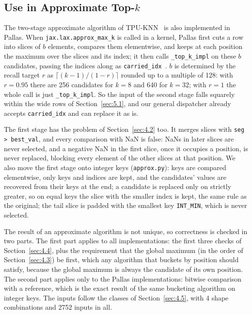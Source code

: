 \documentclass[sigconf,nonacm,balance=false]{acmart}
\newcommand{\code}[1]{\texttt{#1}}
\begin{document}
\subsection{\texorpdfstring{Use in Approximate Top-$k$}{Use in Approximate Top-k}}
\label{sec:8.3}

The two-stage approximate algorithm of TPU-KNN~\cite{chern2022tpuknn} is also implemented in Pallas. When \code{jax.\allowbreak{}lax.\allowbreak{}approx\_\allowbreak{}max\_\allowbreak{}k} is called in a kernel, Pallas first cuts a row into slices of $b$ elements, compares them elementwise, and keeps at each position the maximum over the slices and its index; it then calls \code{\_\allowbreak{}top\_\allowbreak{}k\_\allowbreak{}impl} on these $b$ candidates, passing the indices along as \code{carried\_\allowbreak{}idx}~\cite{jax-topk-impl}. $b$ is determined by the recall target $r$ as $\lceil (k - 1)/(1 - r) \rceil$ rounded up to a multiple of 128: with $r = 0.95$ there are 256 candidates for $k = 8$ and 640 for $k = 32$; with $r = 1$ the whole call is just \code{\_\allowbreak{}top\_\allowbreak{}k\_\allowbreak{}impl}. So the input of the second stage falls squarely within the wide rows of Section~\ref{sec:5.1}, and our general dispatcher already accepts \code{carried\_\allowbreak{}idx} and can replace it as is.

The first stage has the problem of Section~\ref{sec:4.2} too. It merges slices with \code{seg > best\_\allowbreak{}val}, and every comparison with NaN is false: NaNs in later slices are never selected, and a negative NaN in the first slice, once it occupies a position, is never replaced, blocking every element of the other slices at that position. We also move the first stage onto integer keys (\code{approx.\allowbreak{}py}): keys are compared elementwise, only keys and indices are kept, and the candidates' values are recovered from their keys at the end; a candidate is replaced only on strictly greater, so on equal keys the slice with the smaller index is kept, the same rule as the original; the tail slice is padded with the smallest key \code{INT\_\allowbreak{}MIN}, which is never selected.

The result of an approximate algorithm is not unique, so correctness is checked in two parts. The first part applies to all implementations: the first three checks of Section~\ref{sec:4.4}, plus the requirement that the global maximum (in the order of Section~\ref{sec:4.3}) be first, which any algorithm that buckets by position should satisfy, because the global maximum is always the candidate of its own position. The second part applies only to the Pallas implementations: bitwise comparison with a reference, which is the exact result of the same bucketing algorithm on integer keys. The inputs follow the classes of Section~\ref{sec:4.5}, with 4 shape combinations and 2752 inputs in all.
\end{document}

